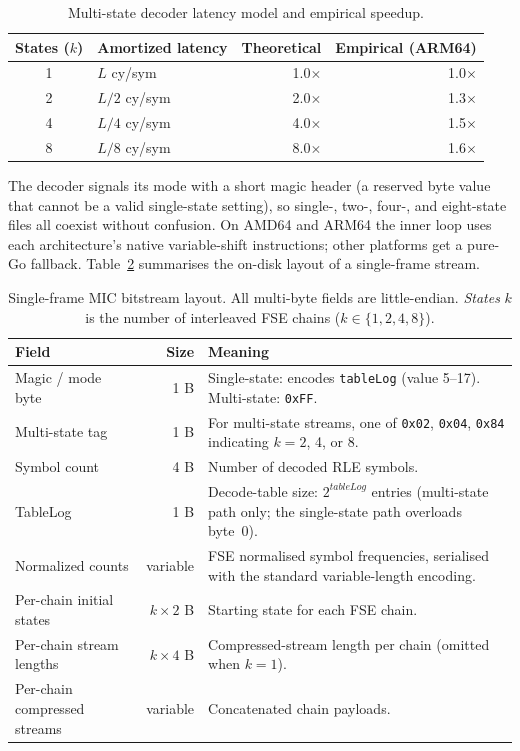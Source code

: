 \documentclass[journal]{IEEEtran}
\begin{document}
\begin{table}[htbp]
\centering
\caption{Multi-state decoder latency model and empirical speedup.}
\label{tab:latency}
\begin{tabular}{clrr}
\toprule
States ($k$) & Amortized latency & Theoretical & Empirical (ARM64) \\
\midrule
1 & $L$ cy/sym & 1.0$\times$ & 1.0$\times$ \\
2 & $L/2$ cy/sym & 2.0$\times$ & 1.3$\times$ \\
4 & $L/4$ cy/sym & 4.0$\times$ & 1.5$\times$ \\
8 & $L/8$ cy/sym & 8.0$\times$ & 1.6$\times$ \\
\bottomrule
\end{tabular}
\end{table}

The decoder signals its mode with a short magic header (a reserved byte
value that cannot be a valid single-state setting), so single-, two-, four-,
and eight-state files all coexist without confusion. On AMD64 and ARM64 the
inner loop uses each architecture's native variable-shift instructions; other
platforms get a pure-Go fallback. Table~\ref{tab:format} summarises the
on-disk layout of a single-frame stream.

\begin{table}[htbp]
\centering
\caption{Single-frame MIC bitstream layout. All multi-byte fields are
little-endian. \emph{States} $k$ is the number of interleaved FSE chains
($k \in \{1,2,4,8\}$).}
\label{tab:format}
\scriptsize
\begin{tabular}{p{2.4cm}rp{4.4cm}}
\toprule
Field & Size & Meaning \\
\midrule
Magic / mode byte & 1 B & Single-state: encodes \texttt{tableLog} (value 5--17). Multi-state: \texttt{0xFF}. \\
Multi-state tag & 1 B & For multi-state streams, one of \texttt{0x02}, \texttt{0x04}, \texttt{0x84} indicating $k=2$, 4, or 8. \\
Symbol count & 4 B & Number of decoded RLE symbols. \\
TableLog & 1 B & Decode-table size: $2^{\textit{tableLog}}$ entries (multi-state path only; the single-state path overloads byte~0). \\
Normalized counts & variable & FSE normalised symbol frequencies, serialised with the standard variable-length encoding. \\
Per-chain initial states & $k \times 2$ B & Starting state for each FSE chain. \\
Per-chain stream lengths & $k \times 4$ B & Compressed-stream length per chain (omitted when $k=1$). \\
Per-chain compressed streams & variable & Concatenated chain payloads. \\
\bottomrule
\end{tabular}
\end{table}
\end{document}
